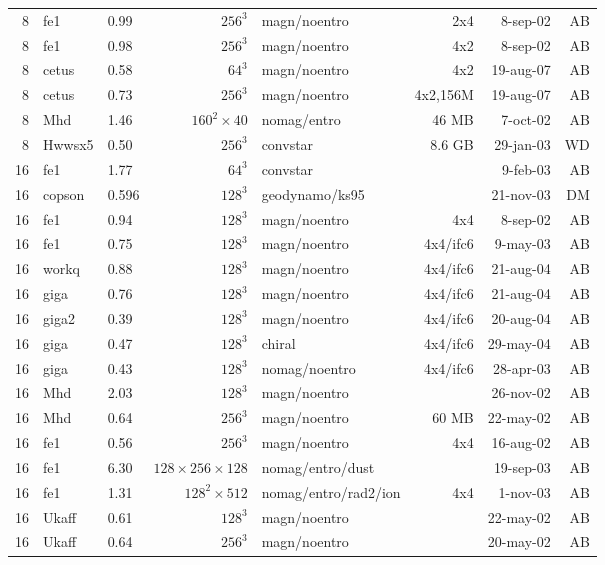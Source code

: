 \documentclass[\mydriver,12pt,twoside,notitlepage,a4paper]{article}
\begin{document}
\begin{center}
\begin{small}
\begin{longtable}{rllrlrrr}
   8 & fe1   & 0.99 & $256^3$ & magn/noentro &  2x4   &  8-sep-02 & AB \\
   8 & fe1   & 0.98 & $256^3$ & magn/noentro &  4x2   &  8-sep-02 & AB \\
   8 & cetus & 0.58 & $ 64^3$ & magn/noentro &4x2     & 19-aug-07 & AB \\
   8 & cetus & 0.73 & $256^3$ & magn/noentro &4x2,156M& 19-aug-07 & AB \\
   8 & Mhd   & 1.46 & $160^2\times40$
                              & nomag/entro &  46 MB &  7-oct-02 & AB \\
   8 & Hwwsx5& 0.50 & $256^3$ & convstar     & 8.6 GB & 29-jan-03 & WD \\
  16 & fe1   & 1.77 &  $64^3$ & convstar     &        &  9-feb-03 & AB \\
  16 & copson& 0.596& $128^3$ & geodynamo/ks95 &      & 21-nov-03 & DM \\
  16 & fe1   & 0.94 & $128^3$ & magn/noentro &  4x4   &  8-sep-02 & AB \\
  16 & fe1   & 0.75 & $128^3$ & magn/noentro &4x4/ifc6&  9-may-03 & AB \\
  16 & workq & 0.88 & $128^3$ & magn/noentro &4x4/ifc6& 21-aug-04 & AB \\
  16 & giga  & 0.76 & $128^3$ & magn/noentro &4x4/ifc6& 21-aug-04 & AB \\
  16 & giga2 & 0.39 & $128^3$ & magn/noentro &4x4/ifc6& 20-aug-04 & AB \\
  16 & giga  & 0.47 & $128^3$ & chiral       &4x4/ifc6& 29-may-04 & AB \\
  16 & giga  & 0.43 & $128^3$ & nomag/noentro&4x4/ifc6& 28-apr-03 & AB \\
  16 & Mhd   & 2.03 & $128^3$ & magn/noentro &        & 26-nov-02 & AB \\
  16 & Mhd   & 0.64 & $256^3$ & magn/noentro &  60 MB & 22-may-02 & AB \\
  16 & fe1   & 0.56 & $256^3$ & magn/noentro &  4x4   & 16-aug-02 & AB \\
  16 & fe1   & 6.30 & $128\!\times\!256\!\times\!128$
                              & nomag/entro/dust &    & 19-sep-03 & AB \\
  16 & fe1   & 1.31 & $128^2{\times}512$                                  
                     & nomag/entro/rad2/ion &  4x4   &  1-nov-03 & AB \\
  16 & Ukaff & 0.61 & $128^3$ & magn/noentro &        & 22-may-02 & AB \\
  16 & Ukaff & 0.64 & $256^3$ & magn/noentro &        & 20-may-02 & AB \\

\end{longtable}
\end{small}
\end{center}
\end{document}
